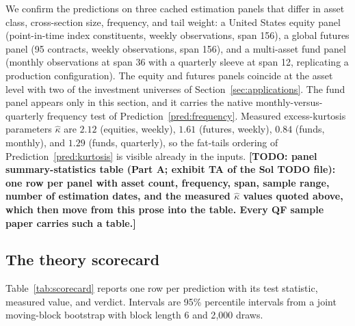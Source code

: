 \documentclass{rQUF2e}
\theoremstyle{plain}
\theoremstyle{remark}
\newcommand{\TODO}[1]{\textbf{[TODO: #1]}}
\begin{document}
We confirm the predictions on three cached estimation panels that differ in
asset class, cross-section size, frequency, and tail weight: a United States
equity panel (point-in-time index constituents, weekly observations, span
156), a global futures panel (95 contracts, weekly observations, span 156),
and a multi-asset fund panel (monthly observations at span 36 with a quarterly
sleeve at span 12, replicating a production configuration). The equity and
futures panels coincide at the asset level with two of the investment
universes of Section~\ref{sec:applications}. The fund panel appears only in
this section, and it carries the native monthly-versus-quarterly frequency
test of Prediction~\ref{pred:frequency}. Measured excess-kurtosis parameters
$\widehat{\kappa}$ are $2.12$ (equities, weekly), $1.61$ (futures, weekly),
$0.84$ (funds, monthly), and $1.29$ (funds, quarterly), so the fat-tails
ordering of Prediction~\ref{pred:kurtosis} is visible already in the inputs.
\TODO{panel summary-statistics table (Part A; exhibit TA of the Sol TODO
file): one row per panel with asset count, frequency, span, sample range,
number of estimation dates, and the measured $\widehat{\kappa}$ values quoted
above,
which then move from this prose into the table. Every QF sample paper carries
such a table.}

\subsection{The theory scorecard}
\label{sec:scorecard}

Table~\ref{tab:scorecard} reports one row per prediction with its test
statistic, measured value, and verdict. Intervals are 95\% percentile
intervals from a joint moving-block bootstrap with block length 6 and 2{,}000
draws.
\end{document}
